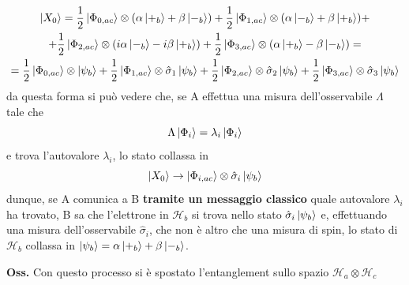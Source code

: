 \begin{gather*}
\ket{X_0}=\frac{1}{2}\ket{\Phi_{0,ac}}\otimes(\alpha\ket{+_b}+\beta\ket{-_b})+\frac{1}{2}
\ket{\Phi_{1,ac}}\otimes(\alpha\ket{-_b}+\beta\ket{+_b})+\\+\frac{1}{2}\ket{\Phi_{2,ac}}\otimes
(i\alpha\ket{-_b}-i\beta\ket{+_b})+\frac{1}{2}\ket{\Phi_{3,ac}}\otimes(\alpha\ket{+_b}-
\beta\ket{-_b})=\\=
\frac{1}{2}\ket{\Phi_{0,ac}}\otimes\ket{\psi_b}+\frac{1}{2}\ket{\Phi_{1,ac}}\otimes
\hat\sigma_1\ket{\psi_b}+\frac{1}{2}\ket{\Phi_{2,ac}}\otimes\hat\sigma_2\ket{\psi_b}+
\frac{1}{2}\ket{\Phi_{3,ac}}\otimes\hat\sigma_3\ket{\psi_b}
\end{gather*}
da questa forma si può vedere che, se A effettua una misura dell'osservabile $\Lambda$ tale che
$$\Lambda\ket{\Phi_i}=\lambda_i\ket{\Phi_i}$$
e trova l'autovalore $\lambda_i$, lo stato collassa in
$$\ket{X_0}\to\ket{\Phi_{i,ac}}\otimes\hat\sigma_i\ket{\psi_b}$$
dunque, se A comunica a B \textbf{tramite un messaggio classico} quale autovalore $\lambda_i$ ha
trovato, B sa che l'elettrone in $\mathcal{H}_b$ si trova nello stato $\hat\sigma_i\ket{\psi_b}$ e,
effettuando una misura dell'osservabile $\hat\sigma_i$, che non è altro che una misura di spin, lo
stato di $\mathcal{H}_b$ collassa in $\ket{\psi_b}=\alpha\ket{+_b}+\beta\ket{-_b}$.

\textbf{Oss.} Con questo processo si è spostato l'entanglement sullo spazio $\mathcal{H}_a\otimes
\mathcal{H}_c$

